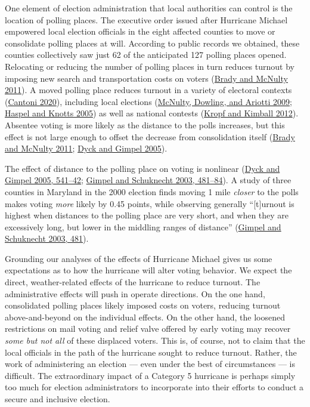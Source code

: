 \documentclass[
  12pt,
]{article}
\begin{document}
One element of election administration that local authorities can control is the location of polling places. The executive order issued after Hurricane Michael empowered local election officials in the eight affected counties to move or consolidate polling places at will. According to public records we obtained, these counties collectively saw just 62 of the anticipated 127 polling places opened. Relocating or reducing the number of polling places in turn reduces turnout by imposing new search and transportation costs on voters (\protect\hyperlink{ref-Brady2011}{Brady and McNulty 2011}). A moved polling place reduces turnout in a variety of electoral contexts (\protect\hyperlink{ref-Cantoni2020}{Cantoni 2020}), including local elections (\protect\hyperlink{ref-McNulty2009}{McNulty, Dowling, and Ariotti 2009}; \protect\hyperlink{ref-Haspel2005}{Haspel and Knotts 2005}) as well as national contests (\protect\hyperlink{ref-Kropf2012}{Kropf and Kimball 2012}). Absentee voting is more likely as the distance to the polls increases, but this effect is not large enough to offset the decrease from consolidation itself (\protect\hyperlink{ref-Brady2011}{Brady and McNulty 2011}; \protect\hyperlink{ref-Dyck2005}{Dyck and Gimpel 2005}).

The effect of distance to the polling place on voting is nonlinear (\protect\hyperlink{ref-Dyck2005}{Dyck and Gimpel 2005, 541--42}; \protect\hyperlink{ref-Gimpel2003}{Gimpel and Schuknecht 2003, 481--84}). A study of three counties in Maryland in the 2000 election finds moving 1 mile \emph{closer} to the polls makes voting \emph{more} likely by 0.45 points, while observing generally ``{[}t{]}urnout is highest when distances to the polling place are very short, and when they are excessively long, but lower in the middling ranges of distance'' (\protect\hyperlink{ref-Gimpel2003}{Gimpel and Schuknecht 2003, 481}).

Grounding our analyses of the effects of Hurricane Michael gives us some expectations as to how the hurricane will alter voting behavior. We expect the direct, weather-related effects of the hurricane to reduce turnout. The administrative effects will push in operate directions. On the one hand, consolidated polling places likely imposed costs on voters, reducing turnout above-and-beyond on the individual effects. On the other hand, the loosened restrictions on mail voting and relief valve offered by early voting may recover \emph{some but not all} of these displaced voters. This is, of course, not to claim that the local officials in the path of the hurricane sought to reduce turnout. Rather, the work of administering an election --- even under the best of circumstances --- is difficult. The extraordinary impact of a Category 5 hurricane is perhaps simply too much for election administrators to incorporate into their efforts to conduct a secure and inclusive election.
\end{document}
